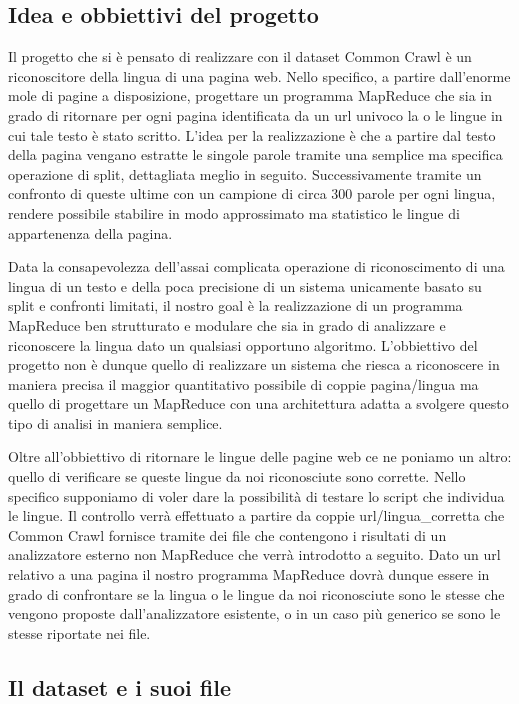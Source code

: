 \documentclass{article}
\newcommand{\MR}{MapReduce}
\newcommand{\CC}{Common Crawl}
\begin{document}
\subsection{Idea e obbiettivi del progetto}
Il progetto che si è pensato di realizzare con il dataset \CC{} è un riconoscitore della lingua di una pagina web. Nello specifico, a partire dall'enorme mole di pagine a disposizione, progettare un programma \MR{} che sia in grado di ritornare per ogni pagina identificata da un url univoco la o le lingue in cui tale testo è stato scritto. L'idea per la realizzazione è che a partire dal testo della pagina vengano estratte le singole parole tramite una semplice ma specifica operazione di split, dettagliata meglio in seguito. Successivamente tramite un confronto di queste ultime con un campione di circa 300 parole per ogni lingua, rendere possibile stabilire in modo approssimato ma statistico le lingue di appartenenza della pagina.

Data la consapevolezza dell'assai complicata operazione di riconoscimento di una lingua di un testo e della poca precisione di un sistema unicamente basato su split e confronti limitati, il nostro goal è la realizzazione di un programma \MR{} ben strutturato e modulare che sia in grado di analizzare e riconoscere la lingua dato un qualsiasi opportuno algoritmo.
L'obbiettivo del progetto non è dunque quello di realizzare un sistema che riesca a riconoscere in maniera precisa il maggior quantitativo possibile di coppie pagina/lingua ma quello di progettare un \MR{} con una architettura adatta a svolgere questo tipo di analisi in maniera semplice.

Oltre all'obbiettivo di ritornare le lingue delle pagine web ce ne poniamo un altro: quello di verificare se queste lingue da noi riconosciute sono corrette. Nello specifico supponiamo di voler dare la possibilità di testare lo script che individua le lingue. Il controllo verrà effettuato a partire da coppie url/lingua\_corretta che \CC{} fornisce tramite dei file che contengono i risultati di un analizzatore esterno non \MR{}  che verrà introdotto a seguito. Dato un url relativo a una pagina il nostro programma \MR{} dovrà dunque essere in grado di confrontare se la lingua o le lingue da noi riconosciute sono le stesse che vengono proposte dall'analizzatore esistente, o in un caso più generico se sono le stesse riportate nei file.


\subsection{Il dataset e i suoi file}
\end{document}
